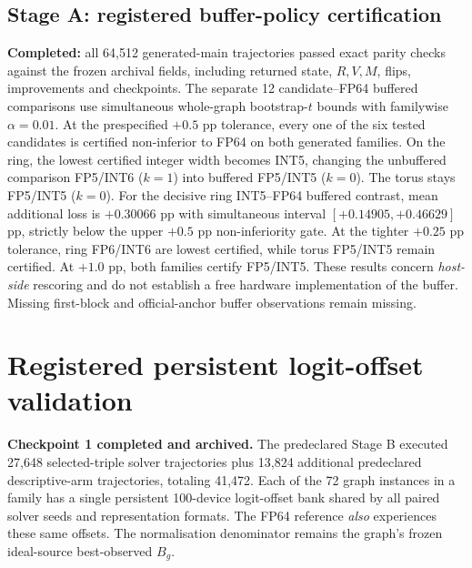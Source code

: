 \documentclass[11pt,a4paper,oneside]{report}
\begin{document}
\subsection{Stage A: registered buffer-policy certification}
\textbf{Completed:} all 64,512 generated-main trajectories
passed exact parity checks against the frozen archival fields,
including returned state, $R,V,M$, flips, improvements and
checkpoints. The separate 12 candidate--FP64 buffered
comparisons use simultaneous whole-graph bootstrap-$t$
bounds with familywise $\alpha=0.01$.
At the prespecified $+0.5$ pp tolerance, every one of
the six tested candidates is certified non-inferior to
FP64 on both generated families. On the ring, the lowest
certified integer width becomes INT5, changing the
unbuffered comparison FP5/INT6 ($k=1$) into buffered
FP5/INT5 ($k=0$). The torus stays FP5/INT5 ($k=0$).
For the decisive ring INT5--FP64 buffered contrast,
mean additional loss is $+0.30066$ pp with simultaneous
interval $[+0.14905,+0.46629]$ pp, strictly below the
upper $+0.5$ pp non-inferiority gate.
At the tighter $+0.25$ pp tolerance, ring FP6/INT6
are lowest certified, while torus FP5/INT5 remain
certified. At $+1.0$ pp, both families certify
FP5/INT5. These results concern \emph{host-side}
rescoring and do not establish a free hardware
implementation of the buffer. Missing first-block and
official-anchor buffer observations remain missing.

\section{Registered persistent logit-offset validation}
\textbf{Checkpoint 1 completed and archived.}
The predeclared Stage B executed 27,648
selected-triple solver trajectories plus 13,824
additional predeclared descriptive-arm
trajectories, totaling 41,472.
Each of the 72 graph instances in a family
has a single persistent 100-device
logit-offset bank shared by all paired
solver seeds and representation formats.
The FP64 reference \emph{also} experiences
these same offsets. The normalisation
denominator remains the graph's frozen
ideal-source best-observed $B_g$.
\end{document}
